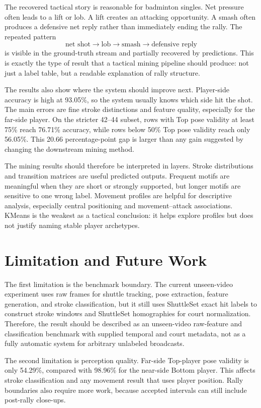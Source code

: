 \documentclass{article}
\begin{document}
The recovered tactical story is reasonable for badminton singles. Net pressure
often leads to a lift or lob. A lift creates an attacking opportunity. A smash
often produces a defensive net reply rather than immediately ending the
rally. The repeated pattern
\[
\text{net shot}\rightarrow\text{lob}\rightarrow
\text{smash}\rightarrow\text{defensive reply}
\]
is visible in the ground-truth stream and partially recovered by predictions.
This is exactly the type of result that a tactical mining pipeline should
produce: not just a label table, but a readable explanation of rally structure.

The results also show where the system should improve next. Player-side
accuracy is high at 93.05\%, so the system usually knows which side hit the
shot. The main errors are fine stroke distinctions and feature quality,
especially for the far-side player. On the stricter 42--44 subset, rows with
Top pose validity at least 75\% reach 76.71\% accuracy, while rows below 50\%
Top pose validity reach only 56.05\%. This 20.66 percentage-point gap is
larger than any gain suggested by changing the downstream mining method.

The mining results should therefore be interpreted in layers. Stroke
distributions and transition matrices are useful predicted outputs. Frequent
motifs are meaningful when they are short or strongly supported, but longer
motifs are sensitive to one wrong label. Movement profiles are helpful for
descriptive analysis, especially central positioning and movement--attack
associations. KMeans is the weakest as a tactical conclusion: it helps explore
profiles but does not justify naming stable player archetypes.

\section{Limitation and Future Work}

The first limitation is the benchmark boundary. The current unseen-video
experiment uses raw frames for shuttle tracking, pose extraction, feature
generation, and stroke classification, but it still uses ShuttleSet exact hit
labels to construct stroke windows and ShuttleSet homographies for court
normalization. Therefore, the result should be described as an unseen-video
raw-feature and classification benchmark with supplied temporal and court
metadata, not as a fully automatic system for arbitrary unlabeled broadcasts.

The second limitation is perception quality. Far-side Top-player pose
validity is only 54.29\%, compared with 98.96\% for the near-side Bottom
player. This affects stroke classification and any movement result that uses
player position. Rally boundaries also require more work, because accepted
intervals can still include post-rally close-ups.
\end{document}
